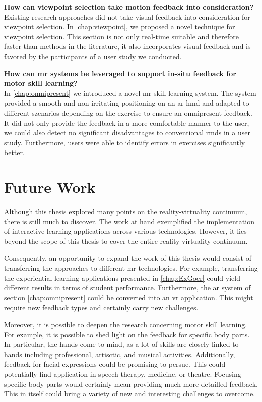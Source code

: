 \textbf{How can viewpoint selection take motion feedback into consideration?}\\
Existing research approaches did not take visual feedback into consideration for viewpoint selection.
In \autoref{chap:viewpoint}, we proposed a novel technique for viewpoint selection.
This section is not only real-time suitable and therefore faster than methods in the literature, it also incorporates visual feedback and is favored by the participants of a user study we conducted.

\textbf{How can \acrlong{mr} systems be leveraged to support in-situ feedback for motor skill learning?}\\
In \autoref{chap:omnipresent} we introduced a novel \acrshort{mr} skill learning system.
The system provided a smooth and non irritating positioning on an \acrshort{ar} \acrshort{hmd} and adapted to different szenarios depending on the exercise to ensure an omnipresent feedback.
It did not only provide the feedback in a more comfortable manner to the user, we could also detect no significant disadvantages to conventional \acrshort{rmd}s in a user study.
Furthermore, users were able to identify errors in exercises significantly better.

\section{Future Work}
\label{sec:conclusion:future}

Although this thesis explored many points on the reality-virtuality continuum, there is still much to discover.
The work at hand exemplified the implementation of interactive learning applications across various technologies.
However, it lies beyond the scope of this thesis to cover the entire reality-virtuality continuum.

Consequently, an opportunity to expand the work of this thesis would consist of transferring the approaches to different \acrshort{mr} technologies.
For example, transferring the experiential learning applications presented in \autoref{chap:ExGoer} could yield different results in terms of student performance.
Furthermore, the \acrshort{ar} system of section \autoref{chap:omnipresent} could be converted into an \acrshort{vr} application.
This might require new feedback types and certainly carry new challenges.

Moreover, it is possible to deepen the research concerning motor skill learning.
For example, it is possible to shed light on the feedback for specific body parts.
In particular, the hands come to mind, as a lot of skills are closely linked to hands including professional, artisctic, and musical activities.
Additionally, feedback for facial expressions could be promising to persue.
This could potentially find application in speech therapy, medicine, or theatre.
Focusing specific body parts would certainly mean providing much more detailled feedback.
This in itself could bring a variety of new and interesting challenges to overcome.

